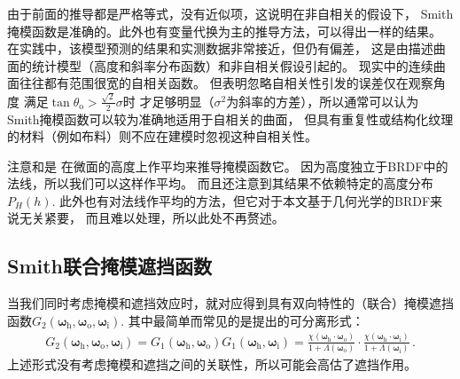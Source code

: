 由于前面的推导都是严格等式，没有近似项，这说明在非自相关的假设下，
Smith掩模函数是准确的。此外也有变量代换为主的推导方法，可以得出一样的结果。
在实践中，该模型预测的结果和实测数据非常接近，但仍有偏差，
这是由描述曲面的统计模型（高度和斜率分布函数）和非自相关假设引起的。
现实中的连续曲面往往都有范围很宽的自相关函数。
但\citet{841905}表明忽略自相关性引发的误差仅在观察角度
满足$\tan\theta_{\mathrm{o}}>\frac{\sqrt{2}}{2}\sigma$时
才足够明显（$\sigma^2$为斜率的方差），所以通常可以认为
Smith掩模函数可以较为准确地适用于自相关的曲面，
但具有重复性或结构化纹理的材料（例如布料）则不应在建模时忽视这种自相关性。

注意和是
在微面的高度上作平均来推导掩模函数它。
因为高度独立于BRDF中的法线，所以我们可以这样作平均。
而且还注意到其结果不依赖特定的高度分布$P_H(h)$.
此外也有对法线作平均的方法，但它对于本文基于几何光学的BRDF来说无关紧要，
而且难以处理，所以此处不再赘述。

\subsection*{Smith联合掩模遮挡函数}
当我们同时考虑掩模和遮挡效应时，就对应得到具有双向特性的（联合）掩模遮挡
函数$G_2({\bm\omega}_{\mathrm{h}},{\bm\omega}_{\mathrm{o}},{\bm\omega}_{\mathrm{i}})$.
其中最简单而常见的是\citet{10.5555/2383847.2383874}提出的可分离形式：
\begin{align*}
    G_2({\bm\omega}_{\mathrm{h}},{\bm\omega}_{\mathrm{o}},{\bm\omega}_{\mathrm{i}})
    =G_1({\bm\omega}_{\mathrm{h}},{\bm\omega}_{\mathrm{o}})G_1({\bm\omega}_{\mathrm{h}},{\bm\omega}_{\mathrm{i}})
    =\frac{\chi({\bm\omega}_{\mathrm{h}}\cdot{\bm\omega}_{\mathrm{o}})}
    {1+\Lambda({\bm\omega}_{\mathrm{o}})}\cdot
    \frac{\chi({\bm\omega}_{\mathrm{h}}\cdot{\bm\omega}_{\mathrm{i}})}
    {1+\Lambda({\bm\omega}_{\mathrm{i}})}\, .
\end{align*}
上述形式没有考虑掩模和遮挡之间的关联性，所以可能会高估了遮挡作用。

